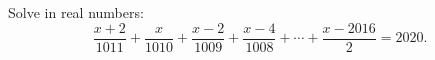 Solve in real numbers:
\[\dfrac{x+2}{1011}+\dfrac{x}{1010}+\dfrac{x-2}{1009}+\dfrac{x-4}{1008}+\cdots+\dfrac{x-2016}{2}=2020.\]
